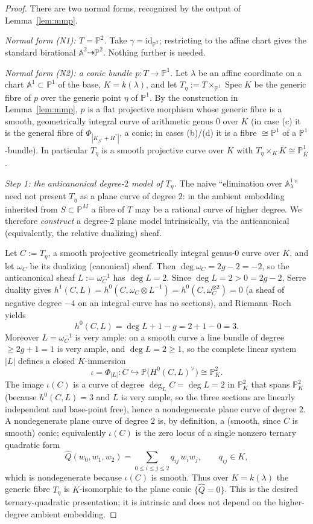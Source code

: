 \documentclass{amsart}
\theoremstyle{plain}
\theoremstyle{definition}
\newcommand{\PP}{\mathbb{P}}
\newcommand{\AA}{\mathbb{A}}
\DeclareMathOperator{\Spec}{Spec}
\begin{document}
\begin{proof}
There are two normal forms, recognized by the output of Lemma~\ref{lem:mmp}.

\medskip
\emph{Normal form \textup{(N1)}: $T=\PP^2$.}  Take $\gamma=\mathrm{id}_{\PP^2}$;
restricting to the affine chart gives the standard birational
$\AA^2\dashrightarrow\PP^2$.  Nothing further is needed.

\medskip
\emph{Normal form \textup{(N2)}: a conic bundle $p\colon T\to\PP^1$.}
Let $\lambda$ be an affine coordinate on a chart $\AA^1\subset\PP^1$ of the base,
$K=k(\lambda)$, and let $T_\eta:=T\times_{\PP^1}\Spec K$ be the generic fibre of
$p$ over the generic point $\eta$ of $\PP^1$.  By the construction in
Lemma~\ref{lem:mmp}, $p$ is a flat projective morphism whose generic fibre is a
smooth, geometrically integral curve of arithmetic genus $0$ over $K$ (in case
(c) it is the general fibre of $\Phi_{|K_{S^\ast}+H^\ast|}$, a conic; in
cases (b)/(d) it is a fibre $\cong\PP^1$ of a $\PP^1$-bundle).  In particular
$T_\eta$ is a smooth projective curve over $K$ with
$T_\eta\times_K\overline K\cong\PP^1_{\overline K}$.

\smallskip
\emph{Step 1: the anticanonical degree-$2$ model of $T_\eta$.}
The naive ``elimination over $\AA^1_\lambda$'' need not present $T_\eta$ as a
plane curve of degree $2$: in the ambient embedding inherited from
$S\subset\PP^M$ a fibre of $T$ may be a rational curve of higher degree.  We
therefore \emph{construct} a degree-$2$ plane model intrinsically, via the
anticanonical (equivalently, the relative dualizing) sheaf.

Let $C:=T_\eta$, a smooth projective geometrically integral genus-$0$ curve over
$K$, and let $\omega_C$ be its dualizing (canonical) sheaf.  Then
$\deg\omega_C=2g-2=-2$, so the anticanonical sheaf $L:=\omega_C^{-1}$ has
$\deg L=2$.  Since $\deg L=2>0=2g-2$, Serre duality gives
$h^1(C,L)=h^0(C,\omega_C\otimes L^{-1})=h^0(C,\omega_C^{\otimes2})=0$ (a sheaf of
negative degree $-4$ on an integral curve has no sections), and Riemann--Roch
yields
\[
h^0(C,L)=\deg L+1-g=2+1-0=3 .
\]
Moreover $L=\omega_C^{-1}$ is very ample: on a smooth curve a line bundle of
degree $\ge 2g+1=1$ is very ample, and $\deg L=2\ge 1$, so the complete linear
system $|L|$ defines a closed $K$-immersion
\[
\iota=\Phi_{|L|}\colon C\hookrightarrow \PP\bigl(H^0(C,L)^\vee\bigr)\cong\PP^2_K .
\]
The image $\iota(C)$ is a curve of degree $\deg_L C=\deg L=2$ in $\PP^2_K$ that
spans $\PP^2_K$ (because $h^0(C,L)=3$ and $L$ is very ample, so the three
sections are linearly independent and base-point free), hence a nondegenerate
plane curve of degree $2$.  A nondegenerate plane curve of degree $2$ is, by
definition, a (smooth, since $C$ is smooth) conic; equivalently $\iota(C)$ is the
zero locus of a single nonzero ternary quadratic form
\[
\widehat Q(w_0,w_1,w_2)=\sum_{0\le i\le j\le 2}q_{ij}\,w_iw_j,\qquad q_{ij}\in K,
\]
which is nondegenerate because $\iota(C)$ is smooth.  Thus over $K=k(\lambda)$ the
generic fibre $T_\eta$ is $K$-isomorphic to the plane conic $\{\widehat Q=0\}$.
This is the desired ternary-quadratic presentation; it is intrinsic and does not
depend on the higher-degree ambient embedding.


\end{proof}
\end{document}
